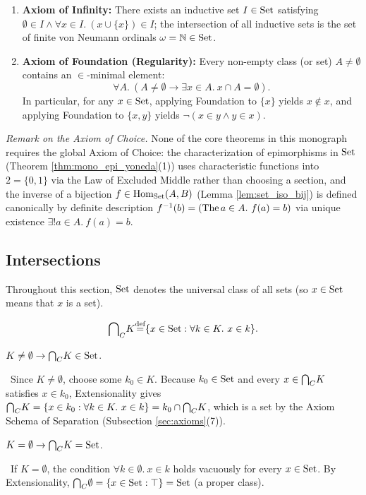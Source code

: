 \documentclass[10pt,a4paper]{article}
\begin{document}
\begin{enumerate}
\item \textbf{Axiom of Infinity:} There exists an inductive set $I \in {\textrm{Set}}$ satisfying $\emptyset \in I \land \forall x \in I.\ (x \cup \{x\}) \in I$; the intersection of all inductive sets is the set of finite von Neumann ordinals $\omega = \mathbb{N} \in {\textrm{Set}}$.
\item \textbf{Axiom of Foundation (Regularity):} Every non-empty class (or set) $A \neq \emptyset$ contains an $\in$-minimal element:
$$\forall A.\ (A \neq \emptyset \to \exists x \in A.\ x \cap A = \emptyset).$$
In particular, for any $x \in {\textrm{Set}}$, applying Foundation to $\{x\}$ yields $x \notin x$, and applying Foundation to $\{x, y\}$ yields $\neg(x \in y \land y \in x)$.
\end{enumerate}
\emph{Remark on the Axiom of Choice.} None of the core theorems in this monograph requires the global Axiom of Choice: the characterization of epimorphisms in ${\textrm{Set}}$ (Theorem \ref{thm:mono_epi_yoneda}(1)) uses characteristic functions into $2 = \{0, 1\}$ via the Law of Excluded Middle rather than choosing a section, and the inverse of a bijection $f \in {\textrm{Hom}}_{\textrm{Set}}(A, B)$ (Lemma \ref{lem:set_iso_bij}) is defined canonically by definite description $f^{-1}(b) = ({\textrm{The\,}} a \in A.\ f(a) = b)$ via unique existence $\exists !a \in A.\ f(a) = b$.

\subsection{Intersections}\label{sec:intersections}
Throughout this section, ${\textrm{Set}}$ denotes the universal class of all sets (so $x \in {\textrm{Set}}$ means that $x$ is a set).

\begin{definition}
$${{\bigcap}_C} K {\stackrel{{\textrm{def}}}{=}} \{x \in {\textrm{Set}} : \forall k\in K.\ x\in k\}.$$
\end{definition}

\begin{exercise}\label{ex:interclass_set}
$K\neq \emptyset \to {{\bigcap}_C} K \in {\textrm{Set}}$.
\end{exercise}
\myprf\ Since $K \neq \emptyset$, choose some $k_0 \in K$. Because $k_0 \in {\textrm{Set}}$ and every $x \in {{\bigcap}_C} K$ satisfies $x \in k_0$, Extensionality gives ${{\bigcap}_C} K = \{x \in k_0 : \forall k\in K.\ x\in k\} = k_0 \cap {{\bigcap}_C} K$, which is a set by the Axiom Schema of Separation (Subsection \ref{sec:axioms}(7)). \myqed

\begin{exercise}
$K=\emptyset \to {{\bigcap}_C} K = {\textrm{Set}}$.
\end{exercise}
\myprf\ If $K = \emptyset$, the condition $\forall k \in \emptyset.\ x \in k$ holds vacuously for every $x \in {\textrm{Set}}$. By Extensionality, ${{\bigcap}_C} \emptyset = \{x \in {\textrm{Set}} : \top\} = {\textrm{Set}}$ (a proper class). \myqed
\end{document}
